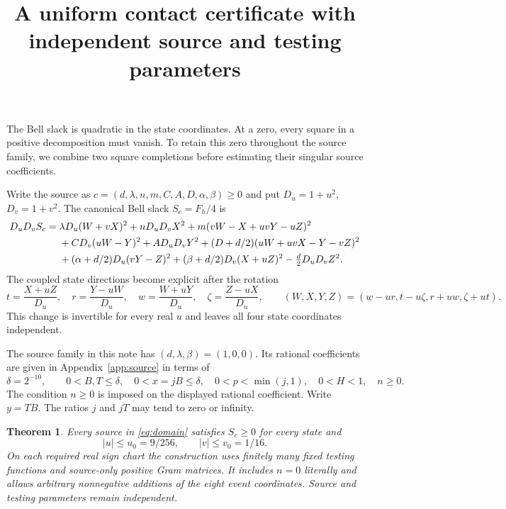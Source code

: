 \documentclass[10pt]{article}
\title{A uniform contact certificate with independent source and testing parameters}
\author{}\date{}
\newtheorem{theorem}{Theorem}
\begin{document}
\maketitle\vspace{-2em}

The Bell slack is quadratic in the state coordinates. At a zero, every
square in a positive decomposition must vanish. To retain this zero
throughout the source family, we combine two square completions before
estimating their singular source coefficients.

Write the source as $c=(d,\lambda,n,m,C,A,D,\alpha,\beta)\geq0$ and
put $D_u=1+u^2$, $D_v=1+v^2$. The canonical Bell slack $S_c=F_h/4$ is
\begin{align}
 D_uD_vS_c={}&\lambda D_u(W+vX)^2+nD_uD_vX^2
 +m(vW-X+uvY-uZ)^2 \notag\\
 &+CD_v(uW-Y)^2+AD_uD_vY^2
 +(D+d/2)(uW+uvX-Y-vZ)^2 \notag\\
 &+(\alpha+d/2)D_u(vY-Z)^2
 +(\beta+d/2)D_v(X+uZ)^2-\tfrac d2D_uD_vZ^2 .
 \label{eq:slack}
\end{align}
The coupled state directions become explicit after the rotation
\begin{equation}
 t=\frac{X+uZ}{D_u},\quad r=\frac{Y-uW}{D_u},\quad
 w=\frac{W+uY}{D_u},\quad \zeta=\frac{Z-uX}{D_u},
 \qquad
 (W,X,Y,Z)=(w-ur,t-u\zeta,r+uw,\zeta+ut).
 \label{eq:rotation}
\end{equation}
This change is invertible for every real $u$ and leaves all four state
coordinates independent.

The source family in this note has $(d,\lambda,\beta)=(1,0,0)$.
Its rational coefficients are given in Appendix~\ref{app:source} in terms of
\begin{equation}
 \delta=2^{-10},\qquad
 0<B,T\leq\delta,\quad0<x=jB\leq\delta,\quad
 0<p<\min(j,1),\quad0<H<1,\quad n\geq0.
 \label{eq:domain}
\end{equation}
The condition $n\geq0$ is imposed on the displayed rational coefficient.
Write $y=TB$. The ratios $j$ and $jT$ may tend to zero or infinity.

\begin{theorem}\label{thm:cap}
Every source in \eqref{eq:domain} satisfies $S_c\geq0$ for every state and
\[
 |u|\leq u_0=9/256,\qquad |v|\leq v_0=1/16.
\]
On each required real sign chart the construction uses finitely many fixed
testing functions and source-only positive Gram matrices. It includes
$n=0$ literally and allows arbitrary nonnegative additions of the eight
event coordinates. Source and testing parameters remain independent.
\end{theorem}
\end{document}
